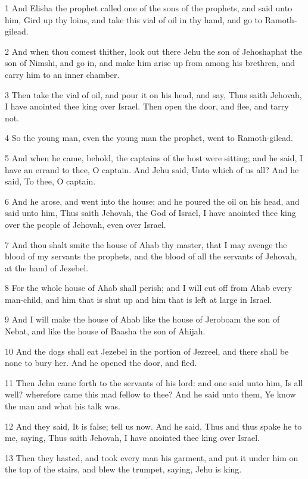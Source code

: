 \par 1 And Elisha the prophet called one of the sons of the prophets, and said unto him, Gird up thy loins, and take this vial of oil in thy hand, and go to Ramoth-gilead.
\par 2 And when thou comest thither, look out there Jehu the son of Jehoshaphat the son of Nimshi, and go in, and make him arise up from among his brethren, and carry him to an inner chamber.
\par 3 Then take the vial of oil, and pour it on his head, and say, Thus saith Jehovah, I have anointed thee king over Israel. Then open the door, and flee, and tarry not.
\par 4 So the young man, even the young man the prophet, went to Ramoth-gilead.
\par 5 And when he came, behold, the captains of the host were sitting; and he said, I have an errand to thee, O captain. And Jehu said, Unto which of us all? And he said, To thee, O captain.
\par 6 And he arose, and went into the house; and he poured the oil on his head, and said unto him, Thus saith Jehovah, the God of Israel, I have anointed thee king over the people of Jehovah, even over Israel.
\par 7 And thou shalt smite the house of Ahab thy master, that I may avenge the blood of my servants the prophets, and the blood of all the servants of Jehovah, at the hand of Jezebel.
\par 8 For the whole house of Ahab shall perish; and I will cut off from Ahab every man-child, and him that is shut up and him that is left at large in Israel.
\par 9 And I will make the house of Ahab like the house of Jeroboam the son of Nebat, and like the house of Baasha the son of Ahijah.
\par 10 And the dogs shall eat Jezebel in the portion of Jezreel, and there shall be none to bury her. And he opened the door, and fled.
\par 11 Then Jehu came forth to the servants of his lord: and one said unto him, Is all well? wherefore came this mad fellow to thee? And he said unto them, Ye know the man and what his talk was.
\par 12 And they said, It is false; tell us now. And he said, Thus and thus spake he to me, saying, Thus saith Jehovah, I have anointed thee king over Israel.
\par 13 Then they hasted, and took every man his garment, and put it under him on the top of the stairs, and blew the trumpet, saying, Jehu is king.
